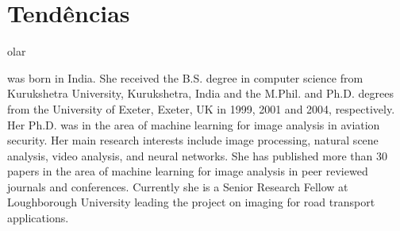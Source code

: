 \documentclass{classe_cn}                 %
\begin{document}
\section{Tendências}

olar



\vspace{1.0cm}
 was born in India. She received the B.S. 
degree in computer science from Kurukshetra University, Kurukshetra, 
India and the M.Phil. and Ph.D. degrees from the University of Exeter, 
Exeter, UK in 1999, 2001 and 2004, respectively. Her Ph.D. was in the 
area of machine learning for image analysis in aviation security. Her 
main research interests include image processing, natural scene analysis,
video analysis, and neural networks. She has published more than 30 papers
in the area of machine learning for image analysis in peer reviewed 
journals and conferences. Currently she is a Senior Research Fellow at
Loughborough University leading the project on imaging for road transport
applications.
\end{document}
